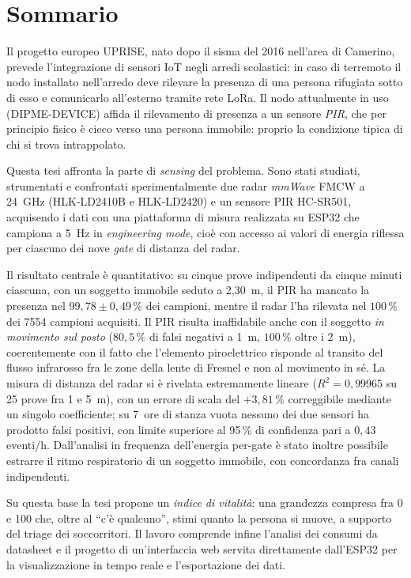 \chapter*{Sommario}

Il progetto europeo UPRISE, nato dopo il sisma del 2016 nell'area di Camerino,
prevede l'integrazione di sensori IoT negli arredi scolastici: in caso di terremoto
il nodo installato nell'arredo deve rilevare la presenza di una persona rifugiata
sotto di esso e comunicarlo all'esterno tramite rete LoRa. Il nodo attualmente in
uso (DIPME-DEVICE) affida il rilevamento di presenza a un sensore \emph{PIR}, che
per principio fisico è cieco verso una persona immobile: proprio la condizione
tipica di chi si trova intrappolato.

Questa tesi affronta la parte di \emph{sensing} del problema. Sono stati studiati,
strumentati e confrontati sperimentalmente due radar \emph{mmWave} FMCW a 24~GHz
(HLK-LD2410B e HLK-LD2420) e un sensore PIR HC-SR501, acquisendo i dati con una
piattaforma di misura realizzata su ESP32 che campiona a 5~Hz in
\emph{engineering mode}, cioè con accesso ai valori di energia riflessa per ciascuno
dei nove \emph{gate} di distanza del radar.

Il risultato centrale è quantitativo: su cinque prove indipendenti da cinque minuti
ciascuna, con un soggetto immobile seduto a 2,30~m, il PIR ha mancato la presenza
nel $99{,}78 \pm 0{,}49\,\%$ dei campioni, mentre il radar l'ha rilevata nel
$100\,\%$ dei 7554 campioni acquisiti. Il PIR risulta inaffidabile anche con il
soggetto \emph{in movimento sul posto} ($80{,}5\,\%$ di falsi negativi a 1~m,
$100\,\%$ oltre i 2~m), coerentemente con il fatto che l'elemento piroelettrico
risponde al transito del flusso infrarosso fra le zone della lente di Fresnel e non
al movimento in sé. La misura di distanza del radar si è rivelata estremamente
lineare ($R^2 = 0{,}99965$ su 25 prove fra 1 e 5~m), con un errore di scala del
$+3{,}81\,\%$ correggibile mediante un singolo coefficiente; su 7~ore di stanza
vuota nessuno dei due sensori ha prodotto falsi positivi, con limite superiore al
95\,\% di confidenza pari a $0{,}43$ eventi/h. Dall'analisi in frequenza
dell'energia per-gate è stato inoltre possibile estrarre il ritmo respiratorio di un
soggetto immobile, con concordanza fra canali indipendenti.

Su questa base la tesi propone un \emph{indice di vitalità}: una grandezza compresa
fra 0 e 100 che, oltre al ``c'è qualcuno'', stimi quanto la persona si muove, a
supporto del triage dei soccorritori. Il lavoro comprende infine l'analisi dei
consumi da datasheet e il progetto di un'interfaccia web servita direttamente
dall'ESP32 per la visualizzazione in tempo reale e l'esportazione dei dati.

